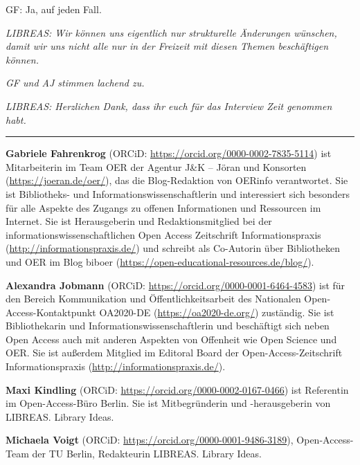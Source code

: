 \documentclass[a4paper,
fontsize=11pt,
oneside,
numbers=noperiodatend,
parskip=half-,
bibliography=totoc,
final
]{scrartcl}
\begin{document}
GF: Ja, auf jeden Fall.

\emph{LIBREAS: Wir können uns eigentlich nur strukturelle Änderungen
wünschen, damit wir uns nicht alle nur in der Freizeit mit diesen Themen
beschäftigen können.}

\emph{GF und AJ stimmen lachend zu.}

\emph{LIBREAS: Herzlichen Dank, dass ihr euch für das Interview Zeit
genommen habt.}

\begin{center}\rule{0.5\linewidth}{0.5pt}\end{center}

\textbf{Gabriele Fahrenkrog} (ORCiD:
\url{https://orcid.org/0000-0002-7835-5114}) ist Mitarbeiterin im Team
OER der Agentur J\&K -- Jöran und Konsorten
(\url{https://joeran.de/oer/}), das die Blog-Redaktion von OERinfo
verantwortet. Sie ist Bibliotheks- und Informationswissenschaftlerin und
interessiert sich besonders für alle Aspekte des Zugangs zu offenen
Informationen und Ressourcen im Internet. Sie ist Herausgeberin und
Redaktionsmitglied bei der informationswissenschaftlichen Open Access
Zeitschrift Informationspraxis (\url{http://informationspraxis.de/}) und
schreibt als Co-Autorin über Bibliotheken und OER im Blog biboer
(\url{https://open-educational-resources.de/blog/}).

\textbf{Alexandra Jobmann} (ORCiD:
\url{https://orcid.org/0000-0001-6464-4583}) ist für den Bereich
Kommunikation und Öffentlichkeitsarbeit des Nationalen
Open-Access-Kontaktpunkt OA2020-DE (\url{https://oa2020-de.org/})
zuständig. Sie ist Bibliothekarin und Informationswissenschaftlerin und
beschäftigt sich neben Open Access auch mit anderen Aspekten von
Offenheit wie Open Science und OER. Sie ist außerdem Mitglied im
Editoral Board der Open-Access-Zeitschrift Informationspraxis
(\url{http://informationspraxis.de/}).

\textbf{Maxi Kindling} (ORCiD:
\url{https://orcid.org/0000-0002-0167-0466}) ist Referentin im
Open-Access-Büro Berlin. Sie ist Mitbegründerin und -herausgeberin von
LIBREAS. Library Ideas.

\textbf{Michaela Voigt} (ORCiD:
\url{https://orcid.org/0000-0001-9486-3189}), Open-Access-Team der TU
Berlin, Redakteurin LIBREAS. Library Ideas.
\end{document}
